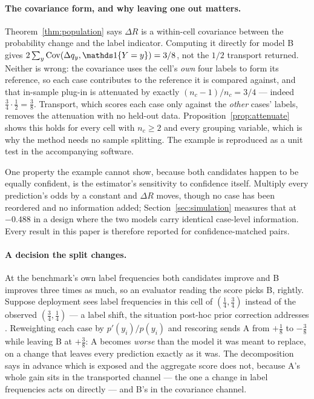 \paragraph{The covariance form, and why leaving one out matters.}
Theorem~\ref{thm:population} says $\Delta R$ is a within-cell covariance between the
probability change and the label indicator. Computing it directly for model B gives
$2\sum_y\operatorname{Cov}(\Delta q_y,\ind\{Y=y\})=3/8$, not the $1/2$ transport returned.
Neither is wrong: the covariance uses the cell's \emph{own} four labels to form its
reference, so each case contributes to the reference it is compared against, and that
in-sample plug-in is attenuated by exactly $(n_c-1)/n_c=3/4$ --- indeed
$\tfrac34\cdot\tfrac12=\tfrac38$. Transport, which scores each case only against the
\emph{other} cases' labels, removes the attenuation with no held-out data.
Proposition~\ref{prop:attenuate} shows this holds for every cell with $n_c\ge2$ and every
grouping variable, which is why the method needs no sample splitting. The example is
reproduced as a unit test in the accompanying software.

One property the example cannot show, because both candidates happen to be equally
confident, is the estimator's sensitivity to confidence itself. Multiply every prediction's
odds by a constant and $\Delta R$ moves, though no case has been reordered and no
information added; Section~\ref{sec:simulation} measures that at $-0.488$ in a design where
the two models carry identical case-level information. Every result in this paper is
therefore reported for confidence-matched pairs.

\paragraph{A decision the split changes.}\label{sec:decision}
At the benchmark's own label frequencies both candidates improve and B improves three times
as much, so an evaluator reading the score picks B, rightly. Suppose deployment sees label
frequencies in this cell of $(\tfrac14,\tfrac34)$ instead of the observed
$(\tfrac34,\tfrac14)$ --- a label shift, the situation post-hoc prior correction addresses
\citep{saerens2002adjusting,lipton2018detecting}. Reweighting each case by $p'(y_i)/p(y_i)$
and rescoring sends A from $+\tfrac18$ to $-\tfrac38$ while leaving B at $+\tfrac38$: A
becomes \emph{worse} than the model it was meant to replace, on a change that leaves every
prediction exactly as it was. The decomposition says in advance which is exposed and the
aggregate score does not, because A's whole gain sits in the transported channel --- the one
a change in label frequencies acts on directly --- and B's in the covariance channel.


